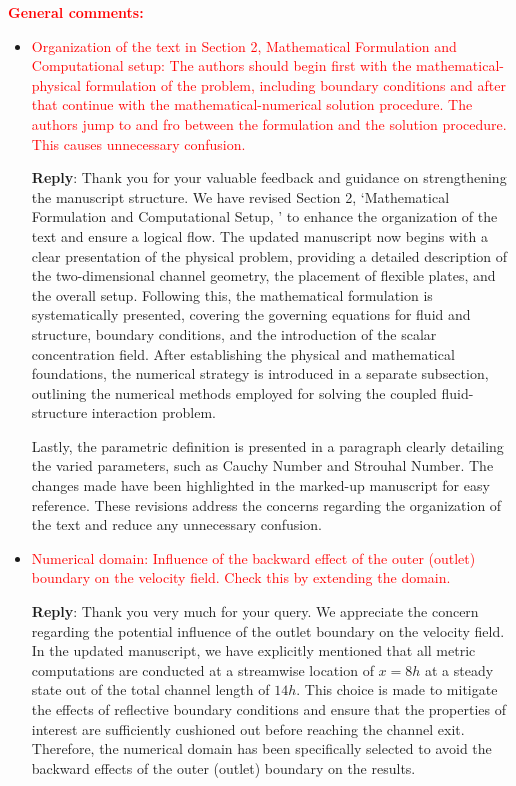 \documentclass[onecolumn,a4paper,amsmath,amssym,pre]{revtex4}
\begin{document}
				\textcolor{red}{\textbf{General comments:}}\\
				\begin{itemize}
					\item \textcolor{red}{Organization of the text in Section 2, Mathematical Formulation and Computational setup: The authors should begin first with the mathematical-physical formulation of the problem, including boundary conditions and after that continue with the mathematical-numerical solution procedure. The authors jump to and fro between the formulation and the solution procedure. This causes unnecessary confusion.
					}
					
					\textbf{Reply}: Thank you for your valuable feedback and guidance on strengthening the manuscript structure. We have revised Section 2, `Mathematical Formulation and Computational Setup, ' to enhance the organization of the text and ensure a logical flow. The updated manuscript now begins with a clear presentation of the physical problem, providing a detailed description of the two-dimensional channel geometry, the placement of flexible plates, and the overall setup. Following this, the mathematical formulation is systematically presented, covering the governing equations for fluid and structure, boundary conditions, and the introduction of the scalar concentration field.
					After establishing the physical and mathematical foundations, the numerical strategy is introduced in a separate subsection, outlining the numerical methods employed for solving the coupled fluid-structure interaction problem.
					
					Lastly, the parametric definition is presented in a paragraph clearly detailing the varied parameters, such as Cauchy Number and Strouhal Number. The changes made have been highlighted in the marked-up manuscript for easy reference. These revisions address the concerns regarding the organization of the text and reduce any unnecessary confusion.
					
					\item \textcolor{red}{Numerical domain: Influence of the backward effect of the outer (outlet) boundary on the velocity field. Check this by extending the domain.}
					
					\textbf{Reply}: Thank you very much for your query. We appreciate the concern regarding the potential influence of the outlet boundary on the velocity field. In the updated manuscript, we have explicitly mentioned that all metric computations are conducted at a streamwise location of $x=8h$ at a steady state out of the total channel length of $14h$. This choice is made to mitigate the effects of reflective boundary conditions and ensure that the properties of interest are sufficiently cushioned out before reaching the channel exit. Therefore, the numerical domain has been specifically selected to avoid the backward effects of the outer (outlet) boundary on the results.
					\\
				\end{itemize}
				
\end{document}
